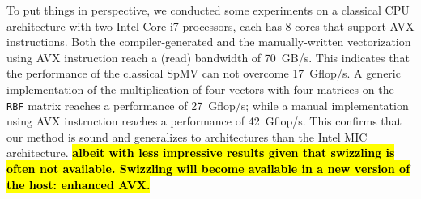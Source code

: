 \documentclass[10pt,conference,compsocconf]{IEEEtran}
\newcommand{\todo}[1]{{\color{red}\textbf{\hl{#1}}\xspace}}
\begin{document}
To put things in perspective, we conducted some experiments on a
classical CPU architecture with two Intel Core i7 processors, each has 8
cores that support AVX instructions. Both the compiler-generated and
the manually-written vectorization using AVX instruction reach a
(read) bandwidth of 70~GB/s. This indicates that the performance of
the classical SpMV can not overcome 17~Gflop/s. A generic
implementation of the multiplication of four vectors with four matrices on
the {\tt RBF} matrix reaches a performance of 27~Gflop/s; while a
manual implementation using AVX instruction reaches a performance of
42~Gflop/s. This confirms that our method is sound and generalizes to
architectures than the Intel MIC architecture. \todo{albeit with less 
impressive results given that swizzling is often not available. Swizzling
will become available in a new version of the host: enhanced AVX.}




\end{document}
